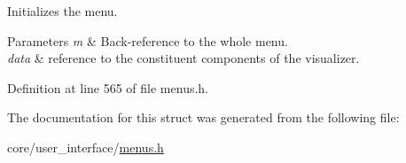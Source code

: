 Initializes the menu. 


\begin{DoxyParams}{Parameters}
{\em m} & Back-\/reference to the whole menu. \\
\hline
{\em data} & reference to the constituent components of the visualizer. \\
\hline
\end{DoxyParams}


Definition at line 565 of file menus.\+h.



The documentation for this struct was generated from the following file\+:\begin{DoxyCompactItemize}
\item 
core/user\+\_\+interface/\hyperlink{menus_8h}{menus.\+h}\end{DoxyCompactItemize}
